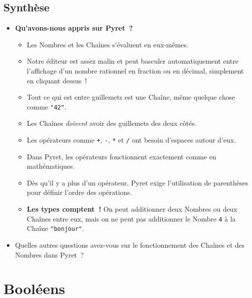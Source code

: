 \documentclass[12pt,a4paper]{article}
\newcommand{\pyret}[1]{\texttt{#1}}
\begin{document}
\subsection{Synthèse}

\begin{thinkbox}
  \begin{itemize}
    \item \textbf{Qu'avons-nous appris sur Pyret~?}
    \begin{itemize}
      \item Les Nombres et les Chaînes s'évaluent en eux-mêmes.
      \item Notre éditeur est assez malin et peut basculer automatiquement entre l'affichage d'un nombre rationnel en fraction ou en décimal, simplement en cliquant dessus~!
      \item Tout ce qui est entre guillemets est une Chaîne, même quelque chose comme \pyret{"42"}.
      \item Les Chaînes \emph{doivent} avoir des guillemets des deux côtés.
      \item Les opérateurs comme \pyret{+}, \pyret{-}, \pyret{*} et \pyret{/} ont besoin d'espaces autour d'eux.
      \item Dans Pyret, les opérateurs fonctionnent exactement comme en mathématiques.
      \item Dès qu'il y a plus d'un opérateur, Pyret exige l'utilisation de parenthèses pour définir l'ordre des opérations.
      \item \textbf{Les types comptent~!} On peut additionner deux Nombres ou deux Chaînes entre eux, mais on ne peut pas additionner le Nombre \texttt{4} à la Chaîne \pyret{"bonjour"}.
    \end{itemize}
  \end{itemize}
\end{thinkbox}

\begin{itemize}
  \item Quelles autres questions avez-vous sur le fonctionnement des Chaînes et des Nombres dans Pyret~?
\end{itemize}

\newpage

\section{Booléens}
\end{document}
